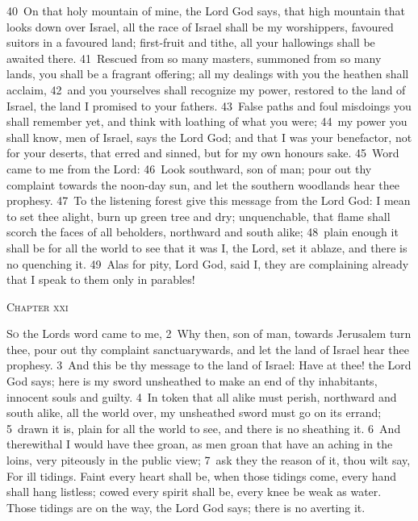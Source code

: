 \documentclass[10pt]{book} %
\begin{document}
\textcolor{benred8}{40}~On that holy mountain of mine, the Lord God says, that high mountain that looks down over Israel, all the race of Israel shall be my worshippers, favoured suitors in a favoured land; first-fruit and tithe, all your hallowings shall be awaited there. \textcolor{benred8}{41}~Rescued from so many masters, summoned from so many lands, you shall be a fragrant offering; all my dealings with you the heathen shall acclaim, \textcolor{benred8}{42}~and you yourselves shall recognize my power, restored to the land of Israel, the land I promised to your fathers. \textcolor{benred8}{43}~False paths and foul misdoings you shall remember yet, and think with loathing of what you were; \textcolor{benred8}{44}~my power you shall know, men of Israel, says the Lord God; and that I was your benefactor, not for your deserts, that erred and sinned, but for my own honour\textquotesingle s sake.
\textcolor{benred8}{45}~Word came to me from the Lord: \textcolor{benred8}{46}~Look southward, son of man; pour out thy complaint towards the noon-day sun, and let the southern woodlands hear thee prophesy. \textcolor{benred8}{47}~To the listening forest give this message from the Lord God: I mean to set thee alight, burn up green tree and dry; unquenchable, that flame shall scorch the faces of all beholders, northward and south alike; \textcolor{benred8}{48}~plain enough it shall be for all the world to see that it was I, the Lord, set it ablaze, and there is no quenching it.
\textcolor{benred8}{49}~Alas for pity, Lord God, said I, they are complaining already that I speak to them only in parables!
\begin{large}\begin{center}\textsc{Chapter xxi}\end{center}\end{large}
\lettrine[lines=2]{S}{o} the Lord\textquotesingle s word came to me, \textcolor{benred8}{2}~Why then, son of man, towards Jerusalem turn thee, pour out thy complaint sanctuarywards, and let the land of Israel hear thee prophesy. \textcolor{benred8}{3}~And this be thy message to the land of Israel: Have at thee! the Lord God says; here is my sword unsheathed to make an end of thy inhabitants, innocent souls and guilty. \textcolor{benred8}{4}~In token that all alike must perish, northward and south alike, all the world over, my unsheathed sword must go on its errand; \textcolor{benred8}{5}~drawn it is, plain for all the world to see, and there is no sheathing it. \textcolor{benred8}{6}~And therewithal I would have thee groan, as men groan that have an aching in the loins, very piteously in the public view; \textcolor{benred8}{7}~ask they the reason of it, thou wilt say, For ill tidings. Faint every heart shall be, when those tidings come, every hand shall hang listless; cowed every spirit shall be, every knee be weak as water. Those tidings are on the way, the Lord God says; there is no averting it.
\end{document}
